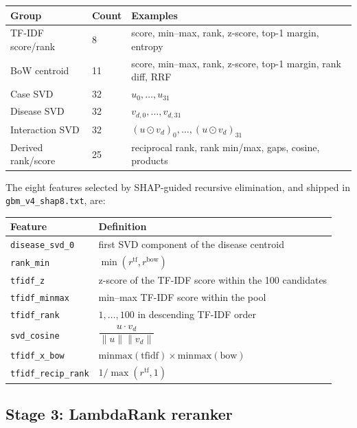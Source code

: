 \documentclass[11pt,a4paper]{article}
\newcommand{\code}[1]{\texttt{\small #1}}
\begin{document}
\begin{center}
\begin{tabular}{lll}
\toprule
Group & Count & Examples\\
\midrule
TF-IDF score/rank & 8 & score, min--max, rank, z-score, top-1 margin, entropy\\
BoW centroid & 11 & score, min--max, rank, z-score, top-1 margin, rank diff, RRF\\
Case SVD & 32 & $u_0,\dots,u_{31}$\\
Disease SVD & 32 & $v_{d,0},\dots,v_{d,31}$\\
Interaction SVD & 32 & $(u\odot v_d)_0,\dots,(u\odot v_d)_{31}$\\
Derived rank/score & 25 & reciprocal rank, rank min/max, gaps, cosine, products\\
\bottomrule
\end{tabular}
\end{center}

The eight features selected by SHAP-guided recursive elimination, and shipped in
\code{gbm\_v4\_shap8.txt}, are:

\begin{center}
\begin{tabular}{ll}
\toprule
Feature & Definition\\
\midrule
\code{disease\_svd\_0} & first SVD component of the disease centroid\\
\code{rank\_min} & $\min(r^{\mathrm{tf}}, r^{\mathrm{bow}})$\\
\code{tfidf\_z} & z-score of the TF-IDF score within the 100 candidates\\
\code{tfidf\_minmax} & min--max TF-IDF score within the pool\\
\code{tfidf\_rank} & $1,\dots,100$ in descending TF-IDF order\\
\code{svd\_cosine} & $\dfrac{u\cdot v_d}{\|u\|\|v_d\|}$\\
\code{tfidf\_x\_bow} & $\mathrm{minmax}(\mathrm{tfidf})\times\mathrm{minmax}(\mathrm{bow})$\\
\code{tfidf\_recip\_rank} & $1/\max(r^{\mathrm{tf}},1)$\\
\bottomrule
\end{tabular}
\end{center}

\subsection{Stage 3: LambdaRank reranker}
\end{document}
